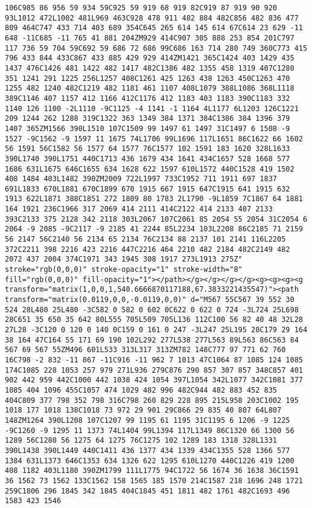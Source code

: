 \documentclass[
]{article}
\begin{document}
\begin{verbatim}
106C985 86 956 59 934 59C925 59 919 68 919 82C919 87 919 90 920 93L1012 472L1002 481L969 463C928 478 911 482 884 482C856 482 836 477 809 464C747 433 714 403 689 354C645 265 614 145 614 67C614 23 629 -11 648 -11C685 -11 765 41 881 204ZM929 414C907 305 888 253 854 201C797 117 736 59 704 59C692 59 686 72 686 99C686 163 714 280 749 360C773 415 796 433 844 433C867 433 885 429 929 414ZM1421 365C1424 403 1429 435 1437 476C1426 481 1422 482 1417 482C1386 482 1355 458 1319 407C1280 351 1241 291 1225 256L1257 408C1261 425 1263 438 1263 450C1263 470 1255 482 1240 482C1219 482 1181 461 1107 408L1079 388L1086 368L1118 389C1146 407 1157 412 1166 412C1176 412 1183 403 1183 390C1183 332 1140 126 1100 -2L1110 -9C1125 -4 1141 -1 1164 4L1177 6L1203 126C1221 209 1244 262 1288 319C1322 363 1349 384 1371 384C1386 384 1396 379 1407 365ZM1566 390L1510 107C1509 99 1497 61 1497 31C1497 6 1508 -9 1527 -9C1562 -9 1597 11 1675 74L1706 99L1696 117L1651 86C1622 66 1602 56 1591 56C1582 56 1577 64 1577 76C1577 102 1591 183 1620 328L1633 390L1740 390L1751 440C1713 436 1679 434 1641 434C1657 528 1668 577 1686 631L1675 646C1655 634 1628 622 1597 610L1572 440C1528 419 1502 408 1484 403L1482 390ZM2009 722L1997 733C1952 711 1911 697 1837 691L1833 670L1881 670C1899 670 1915 667 1915 647C1915 641 1915 632 1913 622L1871 388C1851 272 1809 80 1783 2L1790 -9L1859 7C1867 64 1881 164 1921 236C1966 317 2069 414 2111 414C2122 414 2133 407 2133 393C2133 375 2128 342 2118 303L2067 107C2061 85 2054 55 2054 31C2054 6 2064 -9 2085 -9C2117 -9 2185 41 2244 85L2234 103L2208 86C2185 71 2159 56 2147 56C2140 56 2134 65 2134 76C2134 88 2137 101 2141 116L2205 372C2211 398 2216 423 2216 447C2216 464 2210 482 2184 482C2149 482 2072 437 2004 374C1971 343 1945 308 1917 273L1913 275Z" stroke="rgb(0,0,0)" stroke-opacity="1" stroke-width="8" fill="rgb(0,0,0)" fill-opacity="1"></path></g></g></g></g><g><g><g><g transform="matrix(1,0,0,1,540.6666870117188,67.3833221435547)"><path transform="matrix(0.0119,0,0,-0.0119,0,0)" d="M567 55C567 39 552 30 524 28L480 25L480 -3C582 0 582 0 602 0C622 0 622 0 724 -3L724 25L698 28C651 35 650 35 642 80L555 705L509 705L136 112C100 56 82 40 48 32L28 27L28 -3C120 0 120 0 140 0C159 0 161 0 247 -3L247 25L195 28C179 29 164 38 164 47C164 55 171 69 190 102L292 277L538 277L563 89L563 86C563 84 567 69 567 55ZM496 601L533 313L317 313ZM782 148C777 97 771 62 760 16C798 -2 832 -11 867 -11C916 -11 962 7 1013 47C1064 87 1085 124 1085 174C1085 228 1053 257 979 271L936 279C876 290 857 307 857 348C857 401 902 442 959 442C1000 442 1038 424 1054 397L1054 342L1077 342C1081 377 1085 404 1096 455C1057 474 1029 482 996 482C944 482 883 452 835 404C809 377 798 352 798 316C798 260 829 228 895 215L958 203C1002 195 1018 177 1018 138C1018 73 972 29 901 29C866 29 835 40 807 64L807 148ZM1264 390L1208 107C1207 99 1195 61 1195 31C1195 6 1206 -9 1225 -9C1260 -9 1295 11 1373 74L1404 99L1394 117L1349 86C1320 66 1300 56 1289 56C1280 56 1275 64 1275 76C1275 102 1289 183 1318 328L1331 390L1438 390L1449 440C1411 436 1377 434 1339 434C1355 528 1366 577 1384 631L1373 646C1353 634 1326 622 1295 610L1270 440C1226 419 1200 408 1182 403L1180 390ZM1799 111L1775 94C1722 56 1674 36 1638 36C1591 36 1562 73 1562 133C1562 158 1565 185 1570 214C1587 218 1696 248 1721 259C1806 296 1845 342 1845 404C1845 451 1811 482 1761 482C1693 496 1583 423 1546 
\end{verbatim}
\end{document}
